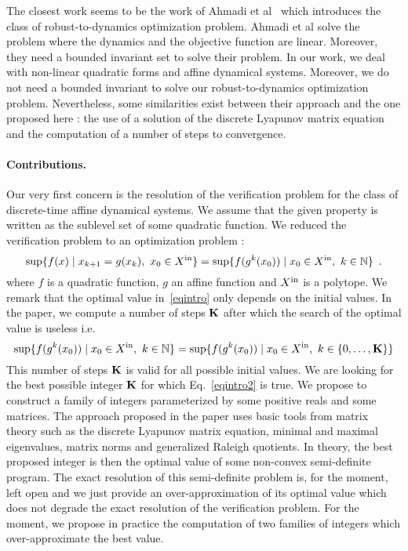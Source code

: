 \documentclass[10pt]{llncs}
\begin{document}
The closest work seems to be the work of Ahmadi et al~\cite{7403149,ahmadi2018robust} which introduces the class of robust-to-dynamics optimization problem. Ahmadi et al solve the problem where the dynamics and the objective function are linear. Moreover, they need a bounded invariant set to solve their problem. In our work, we deal with non-linear quadratic  forms and affine dynamical systems.  Moreover, we do not need a bounded invariant to solve our robust-to-dynamics optimization problem.  Nevertheless, some similarities exist between their approach and the one proposed here : the use of a solution of the discrete Lyapunov matrix equation and the computation of a number of steps to convergence.   
\paragraph{Contributions.}
Our very first concern is the resolution of the verification problem for the class of discrete-time affine dynamical systems. We assume that the given property is written as the sublevel set of some quadratic function. 
We reduced the verification problem to an optimization problem :
\begin{equation}
\label{eqintro}
\sup\{f(x)\mid x_{k+1}=g(x_k),\ x_0\in X^\mathrm{in}\}=\sup\{f( g^k (x_0))\mid  x_0\in X^\mathrm{in},\ k\in\mathbb{N}\}\enspace.
\end{equation}
where $f$ is a quadratic function, $g$ an affine function and $X^\mathrm{in}$ is a polytope. We remark that the optimal value in~\eqref{eqintro} only depends on the initial values.
In the paper, we compute a number of steps $\mathbf{K}$ after which the search of the optimal value is useless i.e.
 \begin{equation}
\label{eqintro2}
\sup\{f( g^k (x_0))\mid  x_0\in X^\mathrm{in},\ k\in\mathbb{N}\}=
\sup\{f( g^k (x_0))\mid  x_0\in X^\mathrm{in},\ k\in \{0,\ldots,\mathbf{K}\}\}
\end{equation}
This number of steps $\mathbf{K}$ is valid for all possible initial values. We are looking for the best possible integer $\mathbf{K}$ for which 
Eq.~\eqref{eqintro2} is true. We propose to construct a family of integers parameterized by some positive reals and some matrices. The approach proposed in the paper uses basic tools from matrix theory such as the discrete Lyapunov matrix equation, minimal and maximal eigenvalues, matrix norms and generalized Raleigh quotients. In theory, the best proposed integer is then the optimal value of some non-convex semi-definite program.  
The exact resolution of this semi-definite problem is, for the moment, left open and we just provide an over-approximation of its optimal value which does not degrade the exact resolution of the verification problem.   For the moment, we propose in practice the computation of two families of integers which over-approximate the best value. 
\end{document}
